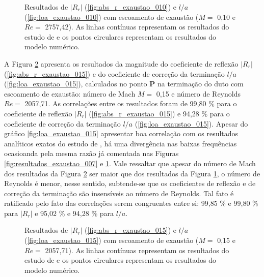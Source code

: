 \begin{figure}[ht!]
\begin{subfigure}{\scaleA \textwidth}
  
\end{subfigure}%
\begin{subfigure}{\scaleA \textwidth}
  
\end{subfigure}
\caption[Resultados de $|R_{r}|$ e $l/a$ com escoamento de exaustão ($M =$ 0,10 e $Re =$ 2757,42)]{Resultados de $|R_{r}|$ (\ref{fig:abs_r_exaustao_010}) e $l/a$ (\ref{fig:loa_exaustao_010}) com escoamento de exaustão ($M =$ 0,10 e $Re =$ 2757,42). As linhas contínuas representam os resultados do estudo de  e os pontos circulares representam os resultados do modelo numérico.}
\label{fig:resultados_exaustao_010}
\end{figure}

\newpage
A Figura \ref{fig:resultados_exaustao_015} apresenta os resultados da magnitude do coeficiente de reflexão $|R_{r}|$ (\ref{fig:abs_r_exaustao_015}) e do coeficiente de correção da terminação $l/a$ (\ref{fig:loa_exaustao_015}), calculados no ponto $\textbf{P}$ na terminação do duto com escoamento de exaustão: número de Mach $M =$ 0,15 e número de Reynolds $Re =$ 2057,71.  As correlações entre os resultados foram de 99,80 \% para o coeficiente de reflexão $|R_{r}|$ (\ref{fig:abs_r_exaustao_015}) e 94,28 \% para o coeficiente de correção da terminação $l/a$ (\ref{fig:loa_exaustao_015}). Apesar do gráfico \ref{fig:loa_exaustao_015} apresentar boa correlação com os resultados analíticos exatos do estudo de , há uma divergência nas baixas frequências ocasioanda pela mesma razão já comentada nas Figuras \ref{fig:resultados_exaustao_007} e \ref{fig:resultados_exaustao_010}. Vale ressaltar que apesar do número de Mach dos resultados da Figura \ref{fig:resultados_exaustao_015} ser maior que dos resultados da Figura \ref{fig:resultados_exaustao_010}, o número de Reynolds é menor, nesse sentido, subtende-se que os coeficientes de reflexão e de correção da terminação são insensíveis ao número de Reynolds. Tal fato é ratificado pelo fato das correlações serem congruentes entre si: 99,85 \% e 99,80 \% para $|R_{r}|$ e 95,02 \% e 94,28 \% para $l/a$. 

\begin{figure}[ht!]
\begin{subfigure}{\scaleA \textwidth}
  
\end{subfigure}%
\begin{subfigure}{\scaleA \textwidth}
  
\end{subfigure}
\caption[Resultados de $|R_{r}|$ e $l/a$ com escoamento de exaustão (M $=$ 0,15 e Re $=$ 2057,71)]{Resultados de $|R_{r}|$ (\ref{fig:abs_r_exaustao_015}) e $l/a$ (\ref{fig:loa_exaustao_015}) com escoamento de exaustão ($M =$ 0,15 e $Re =$ 2057,71). As linhas contínuas representam os resultados do estudo de  e os pontos circulares representam os resultados do modelo numérico.}
\label{fig:resultados_exaustao_015}
\end{figure}

